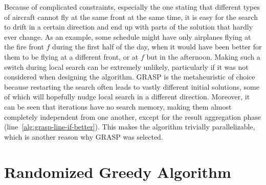 Because of complicated constraints, especially the one stating that different types of aircraft cannot fly at the same front at the same time, it is easy for the search to drift in a certain direction and end up with parts of the solution that hardly ever change.
As an example, some schedule might have only airplanes flying at the fire front $f$ during the first half of the day, when it would have been better for them to be flying at a different front, or at $f$ but in the afternoon.
Making such a switch during local search can be extremely unlikely, particularly if it was not considered when designing the algorithm.
GRASP is the metaheuristic of choice because restarting the search often leads to vastly different initial solutions, some of which will hopefully nudge local search in a different direction.
Moreover, it can be seen that iterations have no search memory, making them almost completely independent from one another, except for the result aggregation phase (line~\ref{alg:grasp-line-if-better}).
This makes the algorithm trivially parallelizable, which is another reason why GRASP was selected.


\section{Randomized Greedy Algorithm}

